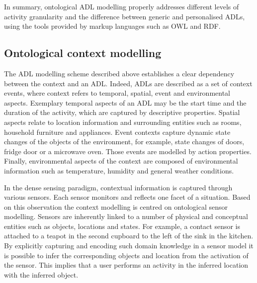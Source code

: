 In summary, ontological ADL modelling properly addresses different levels of activity granularity and the difference between generic and personalised ADLs, using the tools provided by markup languages such as OWL and RDF. 

\subsection{Ontological context modelling}

The ADL modelling scheme described above establishes a clear dependency between the context and an ADL. Indeed, ADLs are described as a set of context events, where context refers to temporal, spatial, event and environmental aspects. Exemplary temporal aspects of an ADL may be the start time and the duration of the activity, which are captured by descriptive properties. Spatial aspects relate to location information and surrounding entities such as rooms, household furniture and appliances. Event contexts capture dynamic state changes of the objects of the environment, for example, state changes of doors, fridge door or a microwave oven. Those events are modelled by action properties. Finally, environmental aspects of the context are composed of environmental information such as temperature, humidity and general weather conditions. 

In the dense sensing paradigm, contextual information is captured through various sensors. Each sensor monitors and reflects one facet of a situation. Based on this observation the context modelling is centred on ontological sensor modelling. Sensors are inherently linked to a number of physical and conceptual entities such as objects, locations and states. For example, a contact sensor is attached to a teapot in the second cupboard to the left of the sink in the kitchen. By explicitly capturing and encoding such domain knowledge in a sensor model it is possible to infer the corresponding objects and location from the activation of the sensor. This implies that a user performs an activity in the inferred location with the inferred object.

